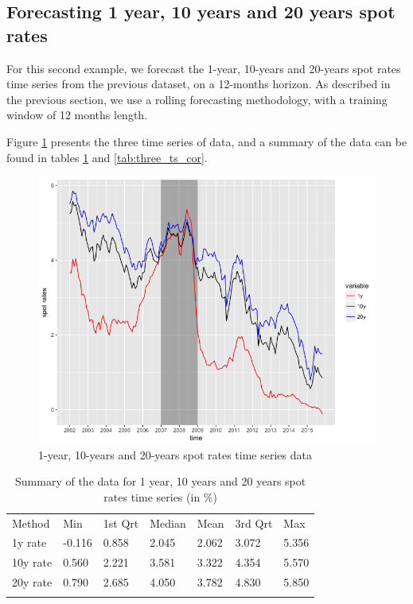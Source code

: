 \subsection{Forecasting 1 year, 10 years and 20 years spot rates}

For this second example, we forecast the 1-year, 10-years and 20-years spot rates time series from the previous dataset, on a 12-months horizon. As described in the previous section, we use a rolling forecasting methodology, with a training window of 12 months length. 

\medskip

Figure \ref{ex2_data} presents the three time series of data, and a summary of the data can be found in tables \ref{tab:three_ts} and \ref{tab:three_ts_cor}.

\begin{figure}
\centering
\includegraphics[width=12cm]{gfx/chapter-rvfl-mts/ex2_data.png}
\caption{1-year, 10-years and 20-years spot rates time series data}
\label{ex2_data}
\end{figure}

\begin{table}[!htb]
\begin{center}
\caption{Summary of the data for 1 year, 10 years and 20 years spot rates time series (in \%)}
\label{tab:three_ts}       %
\begin{tabular}{lllllll}
\hline\noalign{\smallskip}
Method & Min & 1st Qrt  & Median & Mean  & 3rd Qrt  & Max  \\
\noalign{\smallskip}\hline\noalign{\smallskip}
  1y rate & -0.116 & 0.858 & 2.045 & 2.062 & 3.072 & 5.356 \\
  10y rate & 0.560 & 2.221 & 3.581 & 3.322 & 4.354 & 5.570\\
  20y rate & 0.790 & 2.685 & 4.050 & 3.782 & 4.830 & 5.850\\
\noalign{\smallskip}\hline
\end{tabular}
\end{center}
\end{table}


